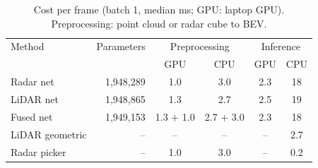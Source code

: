 \begin{table}[t]\centering\caption{Cost per frame (batch 1, median ms; GPU: laptop GPU). Preprocessing: point cloud or radar cube to BEV.}\label{tab:cost}
\small\begin{tabular}{@{}lrcccc@{}}\toprule
Method & Parameters & \multicolumn{2}{c}{Preprocessing} & \multicolumn{2}{c}{Inference} \\
 & & GPU & CPU & GPU & CPU \\\midrule
Radar net & 1{,}948{,}289 & 1.0 & 3.0 & 2.3 & 18 \\
LiDAR net & 1{,}948{,}865 & 1.3 & 2.7 & 2.5 & 19 \\
Fused net & 1{,}949{,}153 & 1.3 + 1.0 & 2.7 + 3.0 & 2.3 & 18 \\
LiDAR geometric & -- & -- & -- & -- & 2.7 \\
Radar picker & -- & 1.0 & 3.0 & -- & 0.2 \\
\bottomrule\end{tabular}\end{table}

